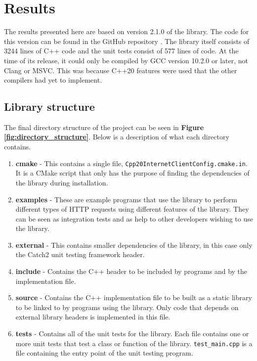 \documentclass[12pt, a4paper]{article}
\begin{document}
\clearpage
\section{Results}
The results presented here are based on version 2.1.0 of the library. The code for this version can be found in the GitHub repository \parencite{Cpp20InternetClient}. The library itself consists of 3244 lines of C++ code and the unit tests consist of 577 lines of code. At the time of its release, it could only be compiled by GCC version 10.2.0 or later, not Clang or MSVC. This was because C++20 features were used that the other compilers had yet to implement.
\subsection{Library structure}
The final directory structure of the project can be seen in \textbf{Figure \ref{fig:directory_structure}}. Below is a description of what each directory contains.
\begin{enumerate}
	\item \textbf{cmake} - This contains a single file, \texttt{Cpp20InternetClientConfig.cmake.in}. It is a CMake script that only has the purpose of finding the dependencies of the library during installation.
	\item \textbf{examples} - These are example programs that use the library to perform different types of HTTP requests using different features of the library. They can be seen as integration tests and as help to other developers wishing to use the library.
	\item \textbf{external} - This contains smaller dependencies of the library, in this case only the Catch2 unit testing framework header.
	\item \textbf{include} - Contains the C++ header to be included by programs and by the implementation file.
	\item \textbf{source} - Contains the C++ implementation file to be built as a static library to be linked to by programs using the library. Only code that depends on external library headers is implemented in this file.
	\item \textbf{tests} - Contains all of the unit tests for the library. Each file contains one or more unit tests that test a class or function of the library. \texttt{test\_main.cpp} is a file containing the entry point of the unit testing program.
\end{enumerate}
\end{document}
